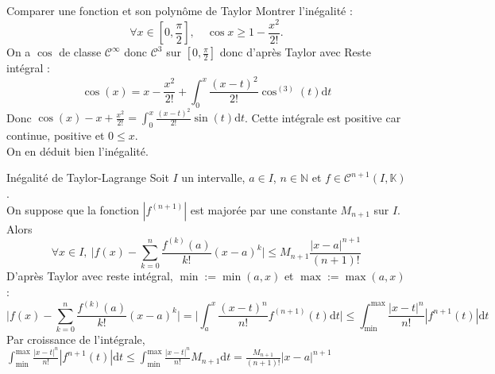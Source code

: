 \documentclass[11pt]{article}
\newcommand*{\K}{\mathbb{K}}
\newcommand*{\N}{\mathbb{N}}
\newcommand*{\m}{\mathcal}
\newcommand{\0}{\varnothing}
\newcommand{\dt}{\textrm{d}t}
\begin{document}
\begin{ex}{Comparer une fonction et son polynôme de Taylor}{}
    Montrer l'inégalité :
    \begin{equation*}
        \forall x \in \left[ 0,\frac{\pi}{2} \right], \quad \cos x \geq 1 - \frac{x^2}{2!}.
    \end{equation*}
    \tcblower
    On a $\cos$ de classe $\m{C}^{\infty}$ donc $\m{C}^3$ sur $[0, \frac{\pi}{2}]$ donc d'après Taylor avec Reste intégral :
    \begin{equation*}
        \cos(x) = x - \frac{x^2}{2!} + \int_0^x\frac{(x-t)^2}{2!}\cos^{(3)}(t)\dt
    \end{equation*}
    Donc $\cos(x) - x + \frac{x^2}{2!} = \int_0^x\frac{(x-t)^2}{2!}\sin(t)\dt$. Cette intégrale est positive car continue, positive et $0\leq x$.\\
    On en déduit bien l'inégalité.
\end{ex}

\begin{prop}{Inégalité de Taylor-Lagrange}{}
    Soit $I$ un intervalle, $a\in I$, $n\in \N$ et $f\in\m{C}^{n+1}(I,\K)$.\\
    On suppose que la fonction $|f^{(n+1)}|$ est majorée par une constante $M_{n+1}$ sur $I$. Alors
    \begin{equation*}
        \forall x \in I, ~ \Big|f(x)-\sum_{k=0}^n\frac{f^{(k)}(a)}{k!}(x-a)^k\Big|\leq M_{n+1}\frac{|x-a|^{n+1}}{(n+1)!}
    \end{equation*}
    \tcblower
    D'après Taylor avec reste intégral, $\min:=\min(a,x)$ et $\max:=\max(a,x)$ :
    \begin{equation*}
        \Big|f(x)-\sum_{k=0}^n\frac{f^{(k)}(a)}{k!}(x-a)^k\Big|=\Big|\int_a^x\frac{(x-t)^n}{n!}f^{(n+1)}(t)\dt\Big|\leq\int_{\min}^{\max}\frac{|x-t|^n}{n!}|f^{n+1}(t)|\dt
    \end{equation*}
    Par croissance de l'intégrale, $\int_{\min}^{\max}\frac{|x-t|^n}{n!}|f^{n+1}(t)|\dt\leq\int_{\min}^{\max}\frac{|x-t|^n}{n!}M_{n+1}\dt=\frac{M_{n+1}}{(n+1)!}|x-a|^{n+1}$
\end{prop}
\end{document}
